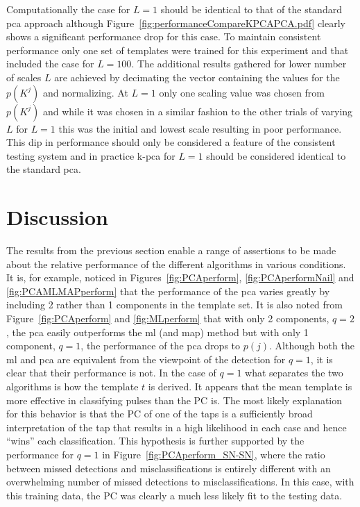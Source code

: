 Computationally the case for $L=1$ should be identical to that of the standard \gls{pca} approach although Figure~\ref{fig:performanceCompareKPCAPCA.pdf} clearly shows a significant performance drop for this case. To maintain consistent performance only one set of templates were trained for this experiment and that included the case for $L=100$. The additional results gathered for lower number of scales $L$ are achieved by decimating the vector containing the values for the $p(K^j)$ and normalizing. At $L=1$ only one scaling value was chosen from $p(K^j)$ and while it was chosen in a similar fashion to the other trials of varying $L$ for $L=1$ this was the initial and lowest scale resulting in poor performance. This dip in performance should only be considered a feature of the consistent testing system and in practice \gls{k-pca} for $L=1$ should be considered identical to the standard \gls{pca}.

\section{Discussion}

The results from the previous section enable a range of assertions to be made about the relative performance of the different algorithms in various conditions. It is, for example, noticed in Figures~\ref{fig:PCAperform}, \ref{fig:PCAperformNail} and \ref{fig:PCAMLMAPperform} that the performance of the \gls{pca} varies greatly by including 2 rather than 1 components in the template set. It is also noted from Figure~\ref{fig:PCAperform} and \ref{fig:MLperform} that with only 2 components, $q=2$, the \gls{pca} easily outperforms the \gls{ml} (and \gls{map}) method but with only 1 component, $q=1$, the performance of the \gls{pca} drops to $p(j)$. Although both the \gls{ml} and \gls{pca} are equivalent from the viewpoint of the detection for $q=1$, it is clear that their performance is not. In the case of $q=1$ what separates the two algorithms is how the template $t$ is derived. It appears that the mean template is more effective in classifying pulses than the PC is. The most likely explanation for this behavior is that the PC of one of the taps is a sufficiently broad interpretation of the tap that results in a high likelihood in each case and hence ``wins'' each classification. This hypothesis is further supported by the performance for $q=1$ in Figure~\ref{fig:PCAperform_SN-SN}, where the ratio between missed detections and misclassifications is entirely different with an overwhelming number of missed detections to misclassifications. In this case, with this training data, the PC was clearly a much less likely fit to the testing data.

